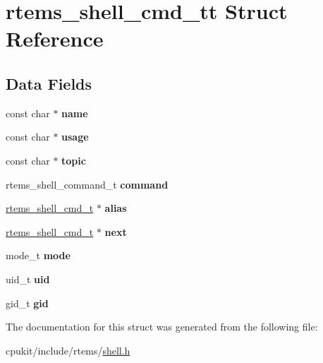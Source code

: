 \hypertarget{structrtems__shell__cmd__tt}{}\section{rtems\+\_\+shell\+\_\+cmd\+\_\+tt Struct Reference}
\label{structrtems__shell__cmd__tt}
\subsection*{Data Fields}
\begin{DoxyCompactItemize}
\item 
\mbox{\label{structrtems__shell__cmd__tt_a0b544b02274af00535162cfbee58f8b8}} 
const char $\ast$ {\bfseries name}
\item 
\mbox{\label{structrtems__shell__cmd__tt_af8e8d44fb5e6185e2d8e86911d9487d1}} 
const char $\ast$ {\bfseries usage}
\item 
\mbox{\label{structrtems__shell__cmd__tt_a3773b7242e91e833529a38c51e4f25f7}} 
const char $\ast$ {\bfseries topic}
\item 
\mbox{\label{structrtems__shell__cmd__tt_a791897b18ab6a179d26a1ce479e5682d}} 
rtems\+\_\+shell\+\_\+command\+\_\+t {\bfseries command}
\item 
\mbox{\label{structrtems__shell__cmd__tt_a159e323c6c1a9e55b1ae9953031a040d}} 
\mbox{\hyperlink{structrtems__shell__cmd__tt}{rtems\+\_\+shell\+\_\+cmd\+\_\+t}} $\ast$ {\bfseries alias}
\item 
\mbox{\label{structrtems__shell__cmd__tt_a9789b20b2cb94815c81d1c842d7a9b8e}} 
\mbox{\hyperlink{structrtems__shell__cmd__tt}{rtems\+\_\+shell\+\_\+cmd\+\_\+t}} $\ast$ {\bfseries next}
\item 
\mbox{\label{structrtems__shell__cmd__tt_aebbbdfcef8ff4b9f786b613e0804a891}} 
mode\+\_\+t {\bfseries mode}
\item 
\mbox{\label{structrtems__shell__cmd__tt_a6d5e74fdd2d33230504330c2234d9d9a}} 
uid\+\_\+t {\bfseries uid}
\item 
\mbox{\label{structrtems__shell__cmd__tt_aca93d6a4587dbb0b5c1a08650470138d}} 
gid\+\_\+t {\bfseries gid}
\end{DoxyCompactItemize}


The documentation for this struct was generated from the following file\+:\begin{DoxyCompactItemize}
\item 
cpukit/include/rtems/\mbox{\hyperlink{shell_8h}{shell.\+h}}\end{DoxyCompactItemize}
